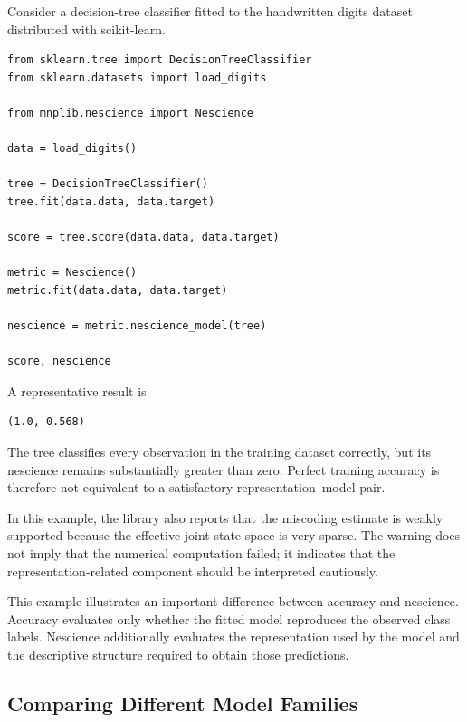 \begin{example}
\label{ex:nescience_decisiontree}

Consider a decision-tree classifier fitted to the handwritten digits dataset distributed with scikit-learn.

\begin{sourcecode}
{\scriptsize
\begin{verbatim}
from sklearn.tree import DecisionTreeClassifier
from sklearn.datasets import load_digits

from mnplib.nescience import Nescience

data = load_digits()

tree = DecisionTreeClassifier()
tree.fit(data.data, data.target)

score = tree.score(data.data, data.target)

metric = Nescience()
metric.fit(data.data, data.target)

nescience = metric.nescience_model(tree)

score, nescience
\end{verbatim}}
\end{sourcecode}

A representative result is

\begin{verbatim}
(1.0, 0.568)
\end{verbatim}

The tree classifies every observation in the training dataset correctly, but its nescience remains substantially greater than zero. Perfect training accuracy is therefore not equivalent to a satisfactory representation--model pair.

In this example, the library also reports that the miscoding estimate is weakly supported because the effective joint state space is very sparse. The warning does not imply that the numerical computation failed; it indicates that the representation-related component should be interpreted cautiously.
\end{example}

This example illustrates an important difference between accuracy and nescience. Accuracy evaluates only whether the fitted model reproduces the observed class labels. Nescience additionally evaluates the representation used by the model and the descriptive structure required to obtain those predictions.


\subsection*{Comparing Different Model Families}

